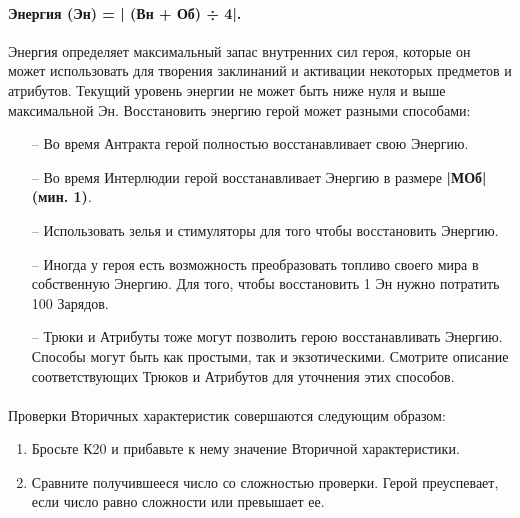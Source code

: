 \paragraph{Энергия (Эн) = | (Вн + Об) ÷ 4|.} Энергия определяет максимальный запас внутренних сил героя, которые он может использовать для творения заклинаний и активации некоторых предметов и атрибутов.
\newline
Текущий уровень энергии не может быть ниже нуля и выше максимальной Эн. Восстановить энергию герой может разными способами:
\begin{itemize}
\item[--] Во время Антракта герой полностью восстанавливает свою Энергию.
\item[--] Во время Интерлюдии герой восстанавливает Энергию в размере \textbf{|МОб|(мин. 1)}.
\item[--] Использовать зелья и стимуляторы для того чтобы восстановить Энергию.
\item[--] Иногда у героя есть возможность преобразовать топливо своего мира в собственную Энергию. Для того, чтобы восстановить 1 Эн нужно потратить 100 Зарядов.
\item[--] Трюки и Атрибуты тоже могут позволить герою восстанавливать Энергию. Способы могут быть как простыми, так и экзотическими. Смотрите описание соответствующих Трюков и Атрибутов для уточнения этих способов.
\end{itemize}
\paragraph{}Проверки Вторичных характеристик совершаются следующим образом:
\begin{enumerate}
\item Бросьте К20 и прибавьте к нему значение Вторичной характеристики.
\item Сравните получившееся число со сложностью проверки. Герой преуспевает, если число равно сложности или превышает ее.
\end{enumerate}
%